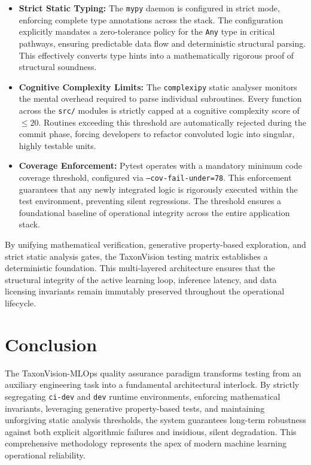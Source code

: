 \begin{itemize}
    \item \textbf{Strict Static Typing:} The \texttt{mypy} daemon is configured in strict mode, enforcing complete type annotations across the stack. The configuration explicitly mandates a zero-tolerance policy for the \texttt{Any} type in critical pathways, ensuring predictable data flow and deterministic structural parsing. This effectively converts type hints into a mathematically rigorous proof of structural soundness.
    \item \textbf{Cognitive Complexity Limits:} The \texttt{complexipy} static analyser monitors the mental overhead required to parse individual subroutines. Every function across the \texttt{src/} modules is strictly capped at a cognitive complexity score of $\le 20$. Routines exceeding this threshold are automatically rejected during the commit phase, forcing developers to refactor convoluted logic into singular, highly testable units.
    \item \textbf{Coverage Enforcement:} Pytest operates with a mandatory minimum code coverage threshold, configured via \texttt{--cov-fail-under=78}. This enforcement guarantees that any newly integrated logic is rigorously executed within the test environment, preventing silent regressions. The threshold ensures a foundational baseline of operational integrity across the entire application stack.
\end{itemize}

By unifying mathematical verification, generative property-based exploration, and strict static analysis gates, the TaxonVision testing matrix establishes a deterministic foundation. This multi-layered architecture ensures that the structural integrity of the active learning loop, inference latency, and data licensing invariants remain immutably preserved throughout the operational lifecycle.

\section{Conclusion}

The TaxonVision-MLOps quality assurance paradigm transforms testing from an auxiliary engineering task into a fundamental architectural interlock. By strictly segregating \texttt{ci-dev} and \texttt{dev} runtime environments, enforcing mathematical invariants, leveraging generative property-based tests, and maintaining unforgiving static analysis thresholds, the system guarantees long-term robustness against both explicit algorithmic failures and insidious, silent degradation. This comprehensive methodology represents the apex of modern machine learning operational reliability.

